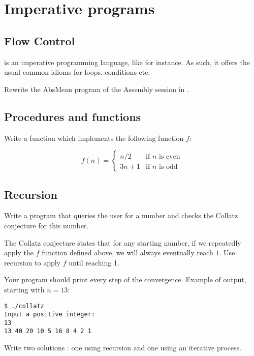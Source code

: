 \documentclass{../../tp}
\begin{document}
\section{Imperative programs}

\subsection{Flow Control}

\pascal is an imperative programming language, like \C for instance. As such, it offers the usual common idioms for loops, conditions etc. 

\begin{instruction}

Rewrite the AbsMean program of the Assembly session in \pascal. 

\end{instruction}

\subsection{Procedures and functions}
\begin{instruction}
	Write a \pascal function which implements the following function $f$:
		
	\begin{equation*}
		f(n) = 
			\begin{cases}
				n/2 & \text{if $n$ is even} \\
				3n + 1 & \text{if $n$ is odd} 
			\end{cases}
	\end{equation*}
\end{instruction}

\subsection{Recursion}
\begin{instruction}
Write a program that queries the user for a number and checks the Collatz conjecture for this number.

The Collatz conjecture states that for any starting number,  if we repeatedly apply the $f$ function defined above, we will always eventually reach $1$. Use recursion to apply $f$ until reaching 1.

Your program should print every step of the convergence. Example of output, starting with $n = 13$: 
\begin{verbatim}
$ ./collatz
Input a positive integer:
13
13 40 20 10 5 16 8 4 2 1
\end{verbatim}

Write two solutions : one using recursion and one using an iterative process.

\end{instruction}
\end{document}
